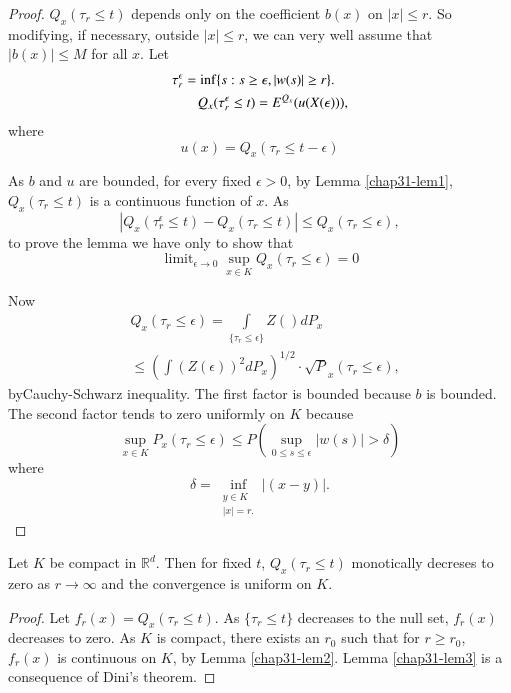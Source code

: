 \begin{proof}
$Q_{x}(\tau_{r}\leq t)$ depends only on the coefficient $b(x)$ on
  $|x|\leq r$. So modifying, if necessary, outside $|x|\leq r$, we can
  very well assume that $|b(x)|\leq M$ for all $x$. Let
\begin{align*}
\tau^{\epsilon}_{r} &= \inf \{s:s\geq \epsilon,|w(s)|\geq r\}.\\
&\quad Q_{x}(\tau^{\epsilon}_{r}\leq t)=E^{Q_{x}}(u(X(\epsilon))),
\end{align*}
where 
$$
u(x)=Q_{x}(\tau_{r}\leq t-\epsilon)
$$

As $b$ and $u$ are bounded, for every fixed $\epsilon>0$, by Lemma
\ref{chap31-lem1}, $Q_{x}(\tau_{r}\leq t)$ is a continuous function of
$x$. As 
$$
|Q_{x}(\tau^{\epsilon}_{r}\leq t)-Q_{x}(\tau_{r}\leq t)|\leq
Q_{x}(\tau_{r}\leq \epsilon),
$$
to prove the lemma we have only to show that
$$
\displaystyle{\mathop{\text{limit}}_{\epsilon\to 0}}\sup\limits_{x\in
    K}Q_{x}(\tau_{r}\leq \epsilon)=0
$$

Now
\begin{align*}
& Q_{x}(\tau_{r}\leq \epsilon)=\int\limits_{\{\tau_{r}\leq
    \epsilon\}}Z()dP_{x}\\
& \leq (\int (Z(\epsilon))^{2}dP_{x})^{1/2}\cdot \surd
  P_{x}(\tau_{r}\leq \epsilon),
\end{align*}
by\pageoriginale Cauchy-Schwarz inequality. The first factor is
bounded because $b$ is bounded. The second factor tends to zero
uniformly on $K$ because
$$
\sup\limits_{x\in K}P_{x}(\tau_{r}\leq \epsilon)\leq
P(\sup\limits_{0\leq s\leq \epsilon}|w(s)|>\delta)
$$
where
$$
\delta=\inf\limits_{\substack{y\in K\\ |x|=r.}}|(x-y)|.
$$
\end{proof}


\begin{lemma}\label{chap31-lem3}
Let $K$ be compact in $\mathbb{R}^{d}$. Then for fixed $t$, $Q_{x}(\tau_{r}\leq
t)$ monotically decreses to zero as $r\to \infty$ and the convergence
is uniform on $K$.
\end{lemma}

\begin{proof}
Let $f_{r}(x)=Q_{x}(\tau_{r}\leq t)$. As $\{\tau_{r}\leq t\}$
decreases to the null set, $f_{r}(x)$ decreases to zero. As $K$ is
compact, there exists an $r_{0}$ such that for $r\geq r_{0}$,
$f_{r}(x)$ is continuous on $K$, by Lemma \ref{chap31-lem2}. Lemma
\ref{chap31-lem3} is a consequence of Dini's theorem.
\end{proof}

